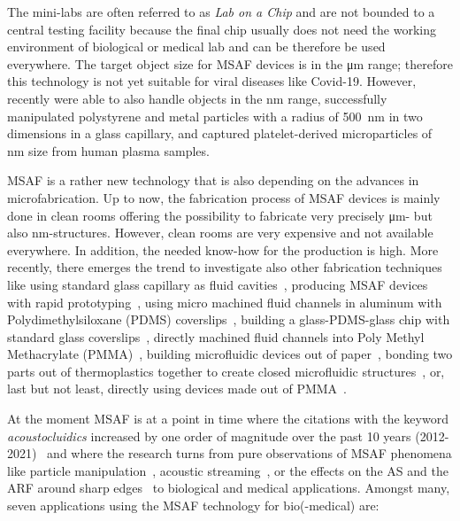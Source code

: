 The mini-labs are often referred to as \emph{Lab on a Chip} and are not bounded 
to a central testing facility because the final chip usually does not need the 
working environment of biological or medical lab and can be therefore be used 
everywhere. The target object size for MSAF devices is in the \si{\um} range; 
therefore this technology is not yet suitable for viral diseases like Covid-19. 
However, recently  were able to also handle objects in the 
\si{\nano\meter} range,  successfully manipulated polystyrene 
and metal particles with a radius of \SI{500}{\nm} in two dimensions in a glass 
capillary, and  captured platelet-derived microparticles of 
\si{\nm} size from human plasma samples.

MSAF is a rather new technology that is also depending on the advances in 
microfabrication. Up to now, the fabrication process of MSAF devices is mainly 
done in clean rooms offering the possibility to fabricate very precisely 
\si{\um}- but also \si{\nm}-structures. However, clean rooms are very expensive 
and not available everywhere. In addition, the needed know-how for the 
production is high. More recently, there emerges the trend to investigate also 
other fabrication techniques like using standard glass capillary as fluid 
cavities~\cite{Wiklund2001,Hammarstrom2010,Hammarstrom2012,Mishra2014,Gralinski2014,Gerlt2022}, 
producing MSAF devices with rapid prototyping~\cite{Adams2012}, using micro 
machined fluid channels in aluminum with Polydimethylsiloxane (PDMS) 
coverslips~\cite{Gautam2018}, building a glass-PDMS-glass chip with standard 
glass coverslips~\cite{Xu2019}, directly machined fluid channels into Poly 
Methyl Methacrylate (PMMA)~\cite{Harris2012}, building microfluidic devices out 
of paper~\cite{Martinez2010}, bonding two parts out of thermoplastics together 
to create closed microfluidic structures~\cite{Mueller2013}, or, last but not 
least, directly using devices made out of PMMA~\cite{Gonzalez2015,Yang2017}.

At the moment MSAF is at a point in time where the citations with the keyword 
\emph{acoustocluidics} increased by one order of magnitude over the past 10 
years (2012-2021)~\cite{Novotny2021} and where the research turns from pure 
observations of MSAF phenomena like particle 
manipulation~\cite{Wiklund2012a,Laurell2007,Collins2016,Gedge2012,Ding2012b,Cetin2016b,Aubert2016,Novotny2021}, 
acoustic streaming~\cite{Hoyos2013,Castro2016,Lei2016}, or the effects on the 
AS and the ARF around sharp 
edges~\cite{Leibacher2015,Chen2021,Doinikov2020,Doinikov2020b} to biological 
and medical applications. Amongst many, seven applications using the MSAF 
technology for bio(-medical) are:

